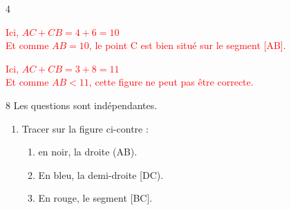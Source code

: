 \documentclass[a4paper]{book}
\begin{document}
{\begin{exerciceNote}{4}
\begin{enumerate}
\begin{minipage}{0.3\linewidth}
                \textcolor{red}{Ici, $AC+CB=4+6=10$\\
                Et comme $AB=10$, le point C est bien situé sur le segment [AB].
                }      
            \end{minipage}
            \hfill
            \vline
            \hfill
            \begin{minipage}{0.3\linewidth}
                \begin{center}
                \end{center}

                \textcolor{red}{Ici, $AC+CB=3+8=11$\\
                Et comme $AB<11$, cette figure ne peut pas être correcte.
                }
            \end{minipage}
        \end{enumerate}
    \end{exerciceNote}


    \begin{exerciceNote}{8}
        Les questions sont indépendantes.
        \begin{enumerate}
            \item 
            \begin{minipage}{0.3\linewidth}
                Tracer sur la figure ci-contre :
                \begin{enumerate}
                    \item en noir, la droite (AB).
                    \item En bleu, la demi-droite [DC).
                    \item En rouge, le segment [BC].
                \end{enumerate}
            \end{minipage}
            \begin{minipage}{0.49\linewidth}
                \begin{center}
                \end{center}
            \end{minipage}
            \hfill

            \bigskip


\end{enumerate}
\end{exerciceNote}}
\end{document}
